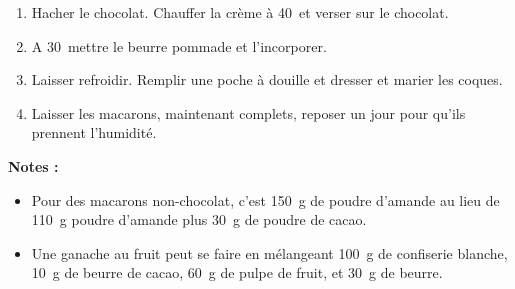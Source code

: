 
\begin{ingredients}
\end{ingredients}


\begin{recipe}
  \begin{enumerate}

  \item Hacher le chocolat.  Chauffer la cr\`eme \`a 40\C\ et verser
    sur le chocolat.

  \item A 30\C\ mettre le beurre pommade et l'incorporer.

  \item Laisser refroidir.  Remplir une poche \`a douille et dresser
    et marier les coques.

  \item Laisser les macarons, maintenant complets, reposer un jour pour
    qu'ils prennent l'humidit\'e.

  \end{enumerate}
\end{recipe}

\textbf{Notes :}
\begin{itemize}
\item Pour des macarons non-chocolat, c'est 150~g de poudre d'amande
  au lieu de 110~g poudre d'amande plus 30~g de poudre de cacao.
\item Une ganache au fruit peut se faire en m\'elangeant 100~g de
  confiserie blanche, 10~g de beurre de cacao, 60~g de pulpe de fruit,
  et 30~g de beurre.
\end{itemize}

